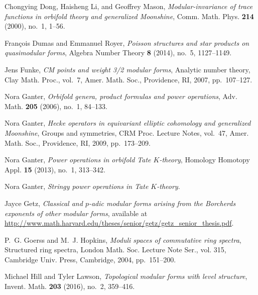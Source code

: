 \documentclass{gtpart}
\theoremstyle{definition}
\theoremstyle{remark}
\renewcommand{\=}{\approx}
\renewcommand{\-}{\sim}
\numberwithin{equation}{section}
\begin{document}
\begin{thebibliography}
Chongying Dong, Haisheng Li, and Geoffrey Mason, \emph{Modular-invariance of
  trace functions in orbifold theory and generalized {M}oonshine}, Comm. Math.
  Phys. \textbf{214} (2000), no.~1, 1--56. 

Fran{\c{c}}ois Dumas and Emmanuel Royer, \emph{Poisson structures and star
  products on quasimodular forms}, Algebra Number Theory \textbf{8} (2014),
  no.~5, 1127--1149. \linebreak {}

Jens Funke, \emph{C{M} points and weight 3/2 modular forms}, Analytic number
  theory, Clay Math. Proc., vol.~7, Amer. Math. Soc., Providence, RI, 2007,
  pp.~107--127. 

Nora Ganter, \emph{Orbifold genera, product formulas and power operations}, Adv.
  Math. \textbf{205} (2006), no.~1, 84--133. 

Nora Ganter, \emph{Hecke operators in equivariant elliptic cohomology and
  generalized {M}oonshine}, Groups and symmetries, CRM Proc. Lecture Notes,
  vol.~47, Amer. Math. Soc., Providence, RI, 2009, pp.~173--209. 

Nora Ganter, \emph{Power operations in orbifold {T}ate {$K$}-theory}, Homology
  Homotopy Appl. \textbf{15} (2013), no.~1, 313--342. 

Nora Ganter, \emph{Stringy power operations in {T}ate {$K$}-theory}. 

Jayce Getz, \emph{Classical and {$p$}-adic modular forms arising from the
  {B}orcherds exponents of other modular forms}, available at \\
  \href{http://www.math.harvard.edu/theses/senior/getz/getz_senior_thesis.pdf}
  {http://www.math.harvard.edu/theses/senior/getz/getz\_senior\_thesis.pdf}.

P.~G. Goerss and M.~J. Hopkins, \emph{Moduli spaces of commutative ring
  spectra}, Structured ring spectra, London Math. Soc. Lecture Note Ser., vol.
  315, Cambridge Univ. Press, Cambridge, 2004, pp.~151--200. 

Michael Hill and Tyler Lawson, \emph{Topological modular forms with level
  structure}, Invent. Math. \textbf{203} (2016), no.~2, 359--416. 


\end{thebibliography}
\end{document}
